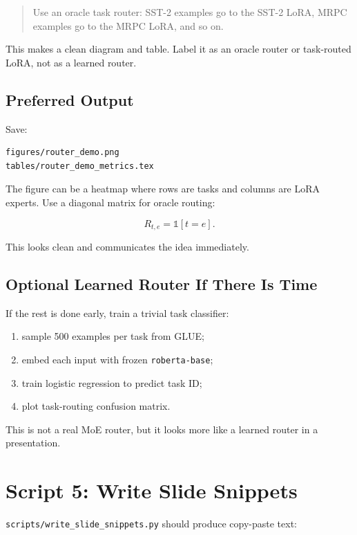 \documentclass[11pt]{article}
\begin{document}
\begin{quote}
Use an oracle task router: SST-2 examples go to the SST-2 LoRA, MRPC examples go to the MRPC LoRA, and so on.
\end{quote}

This makes a clean diagram and table. Label it as an oracle router or task-routed LoRA, not as a learned router.

\subsection{Preferred Output}

Save:

\begin{lstlisting}
figures/router_demo.png
tables/router_demo_metrics.tex
\end{lstlisting}

The figure can be a heatmap where rows are tasks and columns are LoRA experts. Use a diagonal matrix for oracle routing:

\[
R_{t,e} = \mathbb{1}[t=e].
\]

This looks clean and communicates the idea immediately.

\subsection{Optional Learned Router If There Is Time}

If the rest is done early, train a trivial task classifier:

\begin{enumerate}[leftmargin=*]
    \item sample 500 examples per task from GLUE;
    \item embed each input with frozen \texttt{roberta-base};
    \item train logistic regression to predict task ID;
    \item plot task-routing confusion matrix.
\end{enumerate}

This is not a real MoE router, but it looks more like a learned router in a presentation.

\section{Script 5: Write Slide Snippets}

\texttt{scripts/write\_slide\_snippets.py} should produce copy-paste text:
\end{document}
